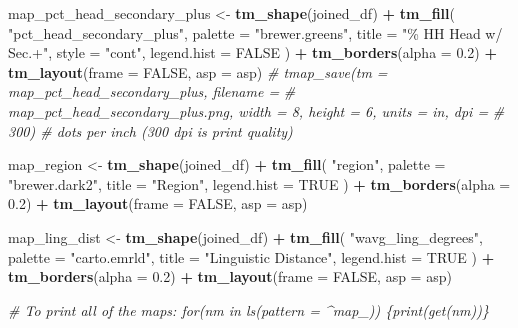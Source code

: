 \documentclass[
]{article}
\newenvironment{Shaded}{\begin{snugshade}}{\end{snugshade}}
\newcommand{\AttributeTok}[1]{\textcolor[rgb]{0.13,0.29,0.53}{#1}}
\newcommand{\CommentTok}[1]{\textcolor[rgb]{0.56,0.35,0.01}{\textit{#1}}}
\newcommand{\ConstantTok}[1]{\textcolor[rgb]{0.56,0.35,0.01}{#1}}
\newcommand{\FloatTok}[1]{\textcolor[rgb]{0.00,0.00,0.81}{#1}}
\newcommand{\FunctionTok}[1]{\textcolor[rgb]{0.13,0.29,0.53}{\textbf{#1}}}
\newcommand{\NormalTok}[1]{#1}
\newcommand{\OtherTok}[1]{\textcolor[rgb]{0.56,0.35,0.01}{#1}}
\newcommand{\SpecialCharTok}[1]{\textcolor[rgb]{0.81,0.36,0.00}{\textbf{#1}}}
\newcommand{\StringTok}[1]{\textcolor[rgb]{0.31,0.60,0.02}{#1}}
\begin{document}
\begin{Shaded}
\begin{Highlighting}[]
\NormalTok{map\_pct\_head\_secondary\_plus }\OtherTok{\textless{}{-}} \FunctionTok{tm\_shape}\NormalTok{(joined\_df) }\SpecialCharTok{+}
    \FunctionTok{tm\_fill}\NormalTok{(}
        \StringTok{"pct\_head\_secondary\_plus"}\NormalTok{, }\AttributeTok{palette =} \StringTok{"brewer.greens"}\NormalTok{,}
        \AttributeTok{title =} \StringTok{"\% HH Head w/ Sec.+"}\NormalTok{, }\AttributeTok{style =} \StringTok{"cont"}\NormalTok{, }\AttributeTok{legend.hist =} \ConstantTok{FALSE}
\NormalTok{    ) }\SpecialCharTok{+}
    \FunctionTok{tm\_borders}\NormalTok{(}\AttributeTok{alpha =} \FloatTok{0.2}\NormalTok{) }\SpecialCharTok{+}
    \FunctionTok{tm\_layout}\NormalTok{(}\AttributeTok{frame =} \ConstantTok{FALSE}\NormalTok{, }\AttributeTok{asp =}\NormalTok{ asp)}
\CommentTok{\# tmap\_save(tm = map\_pct\_head\_secondary\_plus, filename =}
\CommentTok{\# \textquotesingle{}map\_pct\_head\_secondary\_plus.png\textquotesingle{}, width = 8, height = 6, units = \textquotesingle{}in\textquotesingle{}, dpi =}
\CommentTok{\# 300) \# dots per inch (300 dpi is print quality)}

\NormalTok{map\_region }\OtherTok{\textless{}{-}} \FunctionTok{tm\_shape}\NormalTok{(joined\_df) }\SpecialCharTok{+}
    \FunctionTok{tm\_fill}\NormalTok{(}
        \StringTok{"region"}\NormalTok{, }\AttributeTok{palette =} \StringTok{"brewer.dark2"}\NormalTok{, }\AttributeTok{title =} \StringTok{"Region"}\NormalTok{,}
        \AttributeTok{legend.hist =} \ConstantTok{TRUE}
\NormalTok{    ) }\SpecialCharTok{+}
    \FunctionTok{tm\_borders}\NormalTok{(}\AttributeTok{alpha =} \FloatTok{0.2}\NormalTok{) }\SpecialCharTok{+}
    \FunctionTok{tm\_layout}\NormalTok{(}\AttributeTok{frame =} \ConstantTok{FALSE}\NormalTok{, }\AttributeTok{asp =}\NormalTok{ asp)}


\NormalTok{map\_ling\_dist }\OtherTok{\textless{}{-}} \FunctionTok{tm\_shape}\NormalTok{(joined\_df) }\SpecialCharTok{+}
    \FunctionTok{tm\_fill}\NormalTok{(}
        \StringTok{"wavg\_ling\_degrees"}\NormalTok{, }\AttributeTok{palette =} \StringTok{"carto.emrld"}\NormalTok{,}
        \AttributeTok{title =} \StringTok{"Linguistic Distance"}\NormalTok{, }\AttributeTok{legend.hist =} \ConstantTok{TRUE}
\NormalTok{    ) }\SpecialCharTok{+}
    \FunctionTok{tm\_borders}\NormalTok{(}\AttributeTok{alpha =} \FloatTok{0.2}\NormalTok{) }\SpecialCharTok{+}
    \FunctionTok{tm\_layout}\NormalTok{(}\AttributeTok{frame =} \ConstantTok{FALSE}\NormalTok{, }\AttributeTok{asp =}\NormalTok{ asp)}


\CommentTok{\# To print all of the maps: for(nm in ls(pattern = \textquotesingle{}\^{}map\_\textquotesingle{})) \{print(get(nm))\}}



\end{Highlighting}
\end{Shaded}
\end{document}
